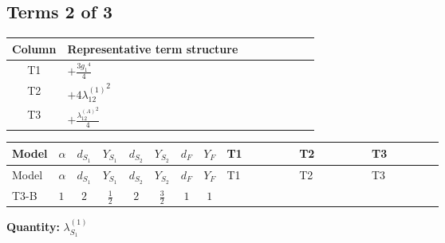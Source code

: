 \documentclass[8pt]{article}
\begin{document}
\begin{landscape}
\subsection*{Terms 2 of 3}
\begin{center}
\begin{tabular}{@{}c >{\raggedright\arraybackslash}p{0.82\linewidth}@{}}
\toprule
Column & Representative term structure \\
\midrule
T1 & \(\displaystyle +\frac{3 {g_1}^4}{4}\) \\
\midrule
T2 & \(\displaystyle +4 {\lambda_{12}^{(1)}}^2\) \\
\midrule
T3 & \(\displaystyle +\frac{{\lambda_{12}^{(A)}}^2}{4}\) \\
\midrule
\bottomrule
\end{tabular}
\end{center}
\smallskip
\tiny
\begin{longtable}{@{}llcccccc >{\raggedright\arraybackslash}p{0.21\linewidth} >{\raggedright\arraybackslash}p{0.21\linewidth} >{\raggedright\arraybackslash}p{0.21\linewidth}@{}}
\toprule
Model & $\alpha$ & $d_{S_1}$ & $Y_{S_1}$ & $d_{S_2}$ & $Y_{S_2}$ & $d_F$ & $Y_F$ & T1 & T2 & T3 \\
\midrule
\endfirsthead
\toprule
Model & $\alpha$ & $d_{S_1}$ & $Y_{S_1}$ & $d_{S_2}$ & $Y_{S_2}$ & $d_F$ & $Y_F$ & T1 & T2 & T3 \\
\midrule
\endhead
T3-B & $1$ & $2$ & $\frac{1}{2}$ & $2$ & $\frac{3}{2}$ & $1$ & $1$ & \scriptsize\adjustbox{max width=\linewidth}{$\begin{gathered} +\frac{3 {g_1}^4}{4}\end{gathered}$} & \scriptsize\adjustbox{max width=\linewidth}{$\begin{gathered} +4 {\lambda_{12}^{(1)}}^2\end{gathered}$} & \scriptsize\adjustbox{max width=\linewidth}{$\begin{gathered} +\frac{{\lambda_{12}^{(A)}}^2}{4}\end{gathered}$} \\
\midrule
\bottomrule
\end{longtable}
\clearpage
\noindent\textbf{Quantity: }$\lambda_{S_1}^{(1)}$\par\smallskip

\end{landscape}
\end{document}
